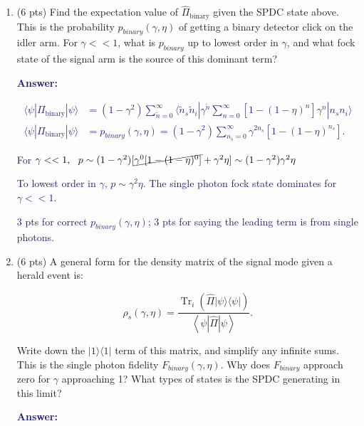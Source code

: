 \documentclass[11pt]{caltech_thesis} %
\begin{document}
\begin{enumerate}
\def\labelenumi{\arabic{enumi}.}
\item
  (6 pts) Find the expectation value of $\hat{\Pi}_{\text {binary}}$ given the SPDC state above. This is the probability $p_{binary}\left(\gamma, \eta\right)$ of getting a binary detector click on the idler arm. For $\gamma << 1$, what is $p_{binary}$ up to lowest order in $\gamma$, and what fock state of the signal arm is the source of this dominant term?

  \textcolor{midnightblue}{ \textbf{Answer:} }

  \textcolor{midnightblue}{

  $$\begin{aligned}
   \langle \psi | \Pi_{\text {binary}} | \psi \rangle &= (1- \gamma^2) \sum_{\tilde{n}=0}^{\infty} \langle \tilde{n}_s \tilde{n}_i | \gamma^{\tilde{n}} \sum_{n=0}^{\infty}[1 - (1-\eta)^{n}] \gamma^n | n_s n_i \rangle \\
   \langle \psi | \Pi_{\text {binary}} | \psi \rangle &= p_{binary}(\gamma, \eta) =  \boxed{(1-\gamma^2) \sum_{n_s=0}^{\infty} \gamma^{2n_s} [1 - (1 - \eta)^{n_s}]}.
   \end{aligned}$$

  }

  \textcolor{midnightblue}{For $\gamma << 1, ~~ p \sim (1 - \gamma^2)[\cancel{\gamma^0[1 - (1 - \eta)^0]} + \gamma^{2}\eta ] \sim (1 - \gamma^2)\gamma^{2}\eta$ }

  \textcolor{midnightblue}{ To lowest order in $\gamma$, $p \sim \gamma^{2}\eta$. The single photon fock state dominates for $\gamma << 1$. }

  \textcolor{midnightblue}{ 3 pts for correct $p_{binary}(\gamma, \eta)$; 3 pts for saying the leading term is from single photons. }
\item
  (6 pts) A general form for the density matrix of the signal mode given a herald event is:

  $$\rho_{s}\left(\gamma, \eta\right)=\frac{\operatorname{Tr}_{i}\left(\hat{\Pi}|\psi\rangle\langle\psi|\right)}{\left\langle\psi\left|\hat{\Pi}\right| \psi\right\rangle}.$$

  Write down the $|1\rangle\langle1|$ term of this matrix, and simplify any infinite sums. This is the single photon fidelity $F_{binary}(\gamma, \eta)$. Why does $F_{binary}$ approach zero for $\gamma$ approaching 1? What types of states is the SPDC generating in this limit?

  \textcolor{midnightblue}{ \textbf{Answer:} }


\end{enumerate}
\end{document}

